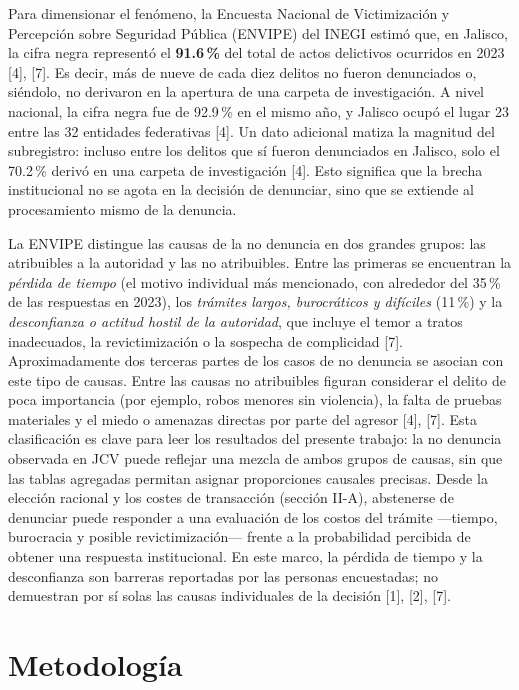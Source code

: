 \documentclass[10pt,twocolumn,letterpaper]{article}
\begin{document}
Para dimensionar el fenómeno, la Encuesta Nacional de Victimización y
Percepción sobre Seguridad Pública (ENVIPE) del INEGI estimó que, en
Jalisco, la cifra negra representó el \textbf{91.6\,\%} del total de
actos delictivos ocurridos en 2023 [4], [7]. Es decir, más de nueve de
cada diez delitos no fueron denunciados o, siéndolo, no derivaron en la
apertura de una carpeta de investigación. A nivel nacional, la cifra
negra fue de 92.9\,\% en el mismo año, y Jalisco ocupó el lugar 23 entre
las 32 entidades federativas [4]. Un dato adicional matiza la magnitud
del subregistro: incluso entre los delitos que sí fueron denunciados en
Jalisco, solo el 70.2\,\% derivó en una carpeta de investigación
[4]. Esto significa que la brecha institucional no se agota en la
decisión de denunciar, sino que se extiende al procesamiento mismo de la
denuncia.

La ENVIPE distingue las causas de la no denuncia en dos grandes grupos:
las atribuibles a la autoridad y las no atribuibles. Entre las primeras
se encuentran la \textit{pérdida de tiempo} (el motivo individual más
mencionado, con alrededor del 35\,\% de las respuestas en 2023), los
\textit{trámites largos, burocráticos y difíciles} (11\,\%) y la
\textit{desconfianza o actitud hostil de la autoridad}, que incluye el
temor a tratos inadecuados, la revictimización o la sospecha de
complicidad [7]. Aproximadamente dos terceras partes de los casos de no
denuncia se asocian con este tipo de causas. Entre las causas no
atribuibles figuran considerar el delito de poca importancia (por
ejemplo, robos menores sin violencia), la falta de pruebas materiales y
el miedo o amenazas directas por parte del agresor [4], [7]. Esta
clasificación es clave para leer los resultados del presente trabajo: la
no denuncia observada en JCV puede reflejar una mezcla de ambos grupos
de causas, sin que las tablas agregadas permitan asignar proporciones
causales precisas. Desde la elección racional y los costes de
transacción (sección II-A), abstenerse de denunciar puede responder a
una evaluación de los costos del trámite —tiempo, burocracia y posible
revictimización— frente a la probabilidad percibida de obtener una
respuesta institucional. En este marco, la pérdida de tiempo y la
desconfianza son barreras reportadas por las personas encuestadas; no
demuestran por sí solas las causas individuales de la decisión [1],
[2], [7].

\section{Metodología}
\end{document}

